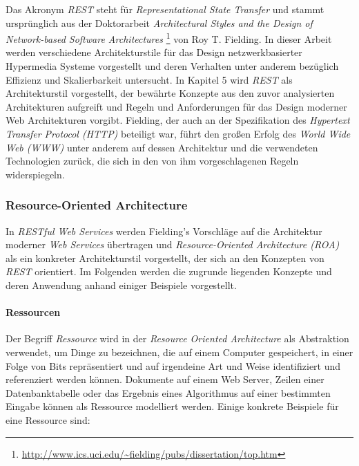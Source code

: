 Das Akronym \textit{REST} steht für \textit{Representational State
  Transfer} und stammt ursprünglich aus der Doktorarbeit
\textit{Architectural Styles and the Design of Network-based Software
  Architectures} \cite{Fielding2000}
\footnote{\url{http://www.ics.uci.edu/~fielding/pubs/dissertation/top.htm}}
von Roy T. Fielding. In dieser Arbeit werden verschiedene
Architekturstile für das Design netzwerkbasierter Hypermedia Systeme
vorgestellt und deren Verhalten unter anderem bezüglich Effizienz und
Skalierbarkeit untersucht. In Kapitel 5 wird \textit{REST} als
Architekturstil vorgestellt, der bewährte Konzepte aus den zuvor
analysierten Architekturen aufgreift und Regeln und Anforderungen für
das Design moderner Web Architekturen vorgibt. Fielding, der auch an
der Spezifikation des \textit{Hypertext Transfer Protocol (HTTP)}
 beteiligt war, führt
den großen Erfolg des \textit{World Wide Web (WWW)}
 unter anderem auf dessen
Architektur und die verwendeten Technologien zurück, die sich in den
von ihm vorgeschlagenen Regeln widerspiegeln.

\subsubsection{Resource-Oriented Architecture}

In \textit{RESTful Web Services} \cite{Richardson07} werden Fielding's
Vorschläge auf die Architektur moderner \textit{Web Services}
übertragen und \textit{Resource-Oriented Architecture (ROA)} als ein
konkreter Architekturstil vorgestellt, der sich an den Konzepten von
\textit{REST} orientiert. Im Folgenden werden die zugrunde liegenden
Konzepte und deren Anwendung anhand einiger Beispiele vorgestellt.

\paragraph{Ressourcen}
Der Begriff \textit{Ressource} wird in der \textit{Resource Oriented
  Architecture} als Abstraktion verwendet, um Dinge zu bezeichnen, die
auf einem Computer gespeichert, in einer Folge von Bits repräsentiert
und auf irgendeine Art und Weise identifiziert und referenziert werden
können. Dokumente auf einem Web Server, Zeilen einer Datenbanktabelle
oder das Ergebnis eines Algorithmus auf einer bestimmten Eingabe
können als Ressource modelliert werden. Einige konkrete Beispiele für
eine Ressource sind:

